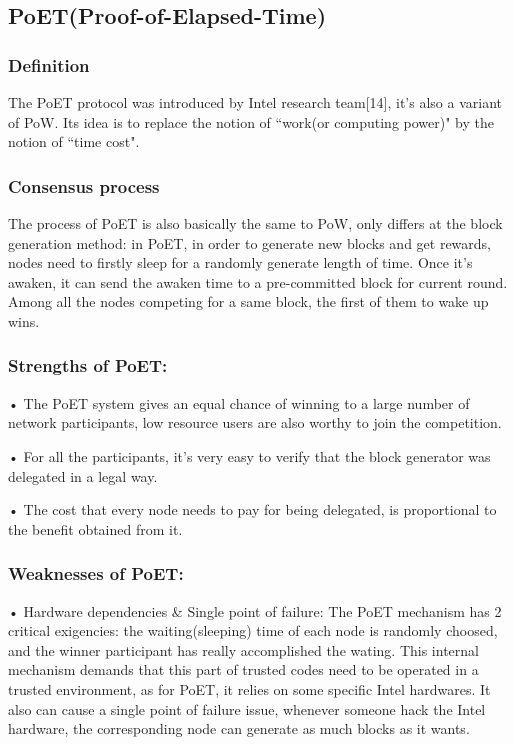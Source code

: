 \documentclass[doublespacing]{bmcart}
\begin{document}
\begin{CJK*}{UTF8}{gbsn}
    \subsection{ PoET(Proof-of-Elapsed-Time)} 
\subsubsection*{Definition} 
The PoET protocol was introduced by Intel research team[14], it’s also a variant of PoW. Its idea is to replace the notion of ``work(or computing power)" by the notion of ``time cost".
	\subsubsection*{Consensus process}
	The process of PoET is also basically the same to PoW, only differs at the block generation method: in PoET, in order to generate new blocks and get rewards, nodes need to firstly sleep for a randomly generate length of time. Once it’s awaken, it can send the awaken time to a pre-committed block for current round. Among all the nodes competing for a same block, the first of them to wake up wins.
	\subsubsection*{Strengths of PoET:}	
    • The PoET system gives an equal chance of winning to a large number of network participants, low resource users are also worthy to join the competition.
    \par • For all the participants, it’s very easy to verify that the block generator was delegated in a legal way.
    \par • The cost that every node needs to pay for being delegated, is proportional to the benefit obtained from it.
\subsubsection*{Weaknesses of PoET:}
    • Hardware dependencies \& Single point of failure: The PoET mechanism has 2 critical exigencies: the waiting(sleeping) time of each node is randomly choosed, and the winner participant has really accomplished the wating. This internal mechanism demands that this part of trusted codes need to be operated in a trusted environment, as for PoET, it relies on some specific Intel hardwares. It also can cause a single point of failure issue, whenever someone hack the Intel hardware, the corresponding node can generate as much blocks as it wants.


\end{CJK*}
\end{document}
